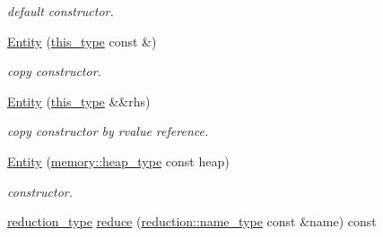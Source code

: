 \begin{DoxyCompactItemize}
\begin{DoxyCompactList}\small\item\em default constructor. \end{DoxyCompactList}\item 
\hypertarget{classhryky_1_1http_1_1header_1_1user__agent_1_1_entity_a17e3b9a7bd4b7fd941d7c73768f0496a}{\hyperlink{classhryky_1_1http_1_1header_1_1user__agent_1_1_entity_a17e3b9a7bd4b7fd941d7c73768f0496a}{Entity} (\hyperlink{classhryky_1_1http_1_1header_1_1user__agent_1_1_entity_a762ebf4d79494c778eca1e49c38c758c}{this\-\_\-type} const \&)}\label{classhryky_1_1http_1_1header_1_1user__agent_1_1_entity_a17e3b9a7bd4b7fd941d7c73768f0496a}

\begin{DoxyCompactList}\small\item\em copy constructor. \end{DoxyCompactList}\item 
\hypertarget{classhryky_1_1http_1_1header_1_1user__agent_1_1_entity_aefde92281be0f127f3bc2ea9761230f6}{\hyperlink{classhryky_1_1http_1_1header_1_1user__agent_1_1_entity_aefde92281be0f127f3bc2ea9761230f6}{Entity} (\hyperlink{classhryky_1_1http_1_1header_1_1user__agent_1_1_entity_a762ebf4d79494c778eca1e49c38c758c}{this\-\_\-type} \&\&rhs)}\label{classhryky_1_1http_1_1header_1_1user__agent_1_1_entity_aefde92281be0f127f3bc2ea9761230f6}

\begin{DoxyCompactList}\small\item\em copy constructor by rvalue reference. \end{DoxyCompactList}\item 
\hypertarget{classhryky_1_1http_1_1header_1_1user__agent_1_1_entity_a17eca65f7e9c353bd32626e1f2bfa1ec}{\hyperlink{classhryky_1_1http_1_1header_1_1user__agent_1_1_entity_a17eca65f7e9c353bd32626e1f2bfa1ec}{Entity} (\hyperlink{classhryky_1_1memory_1_1heap_1_1_base}{memory\-::heap\-\_\-type} const heap)}\label{classhryky_1_1http_1_1header_1_1user__agent_1_1_entity_a17eca65f7e9c353bd32626e1f2bfa1ec}

\begin{DoxyCompactList}\small\item\em constructor. \end{DoxyCompactList}\item 
\hypertarget{classhryky_1_1http_1_1header_1_1user__agent_1_1_entity_ac7db61aa794e15002ffb6a43bdb51e83}{\hyperlink{namespacehryky_a343a9a4c36a586be5c2693156200eadc}{reduction\-\_\-type} \hyperlink{classhryky_1_1http_1_1header_1_1user__agent_1_1_entity_ac7db61aa794e15002ffb6a43bdb51e83}{reduce} (\hyperlink{namespacehryky_1_1reduction_ac686c30a4c8d196bbd0f05629a6b921f}{reduction\-::name\-\_\-type} const \&name) const }\label{classhryky_1_1http_1_1header_1_1user__agent_1_1_entity_ac7db61aa794e15002ffb6a43bdb51e83}


\end{DoxyCompactItemize}
